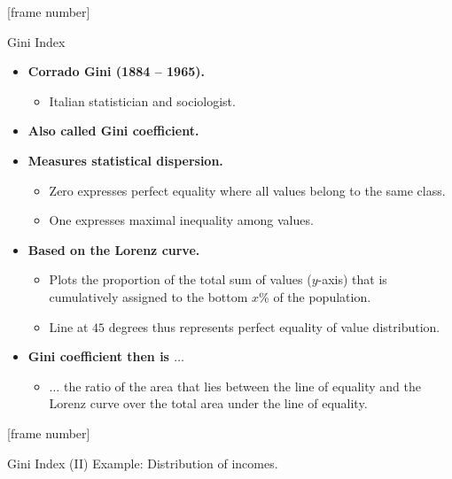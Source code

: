 \documentclass[aspectratio=169,t,table]{beamer}
\begin{document}
  {
    [frame number]
    \begin{frame}{Gini Index}
      \begin{itemize}
        \item \textbf{Corrado Gini (1884 -- 1965).}
        \begin{itemize}
          \item Italian statistician and sociologist.
        \end{itemize}
        \item \textbf{Also called Gini coefficient.}
        \item \textbf{Measures statistical dispersion.}
        \begin{itemize}
          \item Zero expresses perfect equality where all values belong to the same class.
          \item One expresses maximal inequality among values.
        \end{itemize}
        \item \textbf{Based on the Lorenz curve.}
        \begin{itemize}
          \item Plots the proportion of the total sum of values ($y$-axis) that is cumulatively assigned to the bottom $x\%$ of the population.
          \item Line at $45$ degrees thus represents perfect equality of value distribution.
        \end{itemize}
        \item \textbf{Gini coefficient then is $\ldots$}
        \begin{itemize}
          \item $\ldots$ the ratio of the area that lies between the line of equality and the Lorenz curve over the total area under the line of equality.
        \end{itemize}
      \end{itemize}
    \end{frame}
  }

  {
    [frame number]
    \begin{frame}{Gini Index (II)} %
      \centering
      Example: Distribution of incomes.\\[0.5cm]
    \end{frame}
  }
\end{document}
